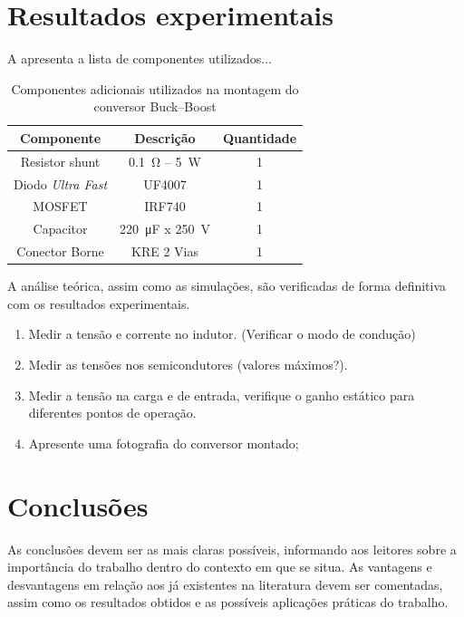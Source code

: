 \section{Resultados experimentais}


A  apresenta a lista de componentes utilizados...

\begin{table}[!ht]
	\centering
	\caption{Componentes adicionais utilizados na montagem do conversor Buck--Boost}
	\label{tab:componentesBuckBoost}
	\begin{tabular}{@{}ccc@{}}
		\toprule
		\textbf{Componente} & \textbf{Descrição} & \textbf{Quantidade} \\ \midrule
		Resistor shunt      & \SI{0.1}{\ohm} -- \SI{5}{\W}             & 1                   \\
		Diodo \emph{Ultra Fast}           & UF4007             & 1                   \\
					MOSFET              & IRF740             & 1                   \\
		Capacitor           & \SI{220}{\micro\farad} x \SI{250}{\V}      & 1                   \\
		Conector Borne      &  KRE 2 Vias    & 1                   \\
		\bottomrule
	\end{tabular}
\end{table}

A análise teórica, assim como as simulações, são verificadas de forma definitiva com os resultados experimentais.
\begin{enumerate}									
	\item  Medir a tensão e corrente no indutor. (Verificar o modo de condução)
	\item  Medir as tensões nos semicondutores (valores máximos?).
	\item Medir a tensão na carga e de entrada, verifique o ganho estático para diferentes pontos de operação.
	\item  Apresente uma fotografia do conversor montado;
\end{enumerate}

\section{Conclusões} 


As conclusões devem ser as mais claras possíveis, informando aos leitores sobre a importância do trabalho dentro do contexto em que se situa. As vantagens e desvantagens em relação aos já existentes na literatura devem ser comentadas, assim como os resultados obtidos e as possíveis aplicações práticas do trabalho.





\balance


